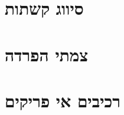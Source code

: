 \documentclass[]{article}
\def\insert#1{}
\begin{document}
\section*{סיווג קשתות}
\insert{edges}
\section*{צמתי הפרדה}
\insert{cut-vertex}
\section*{רכיבים אי פריקים}
\insert{block}
\end{document}
